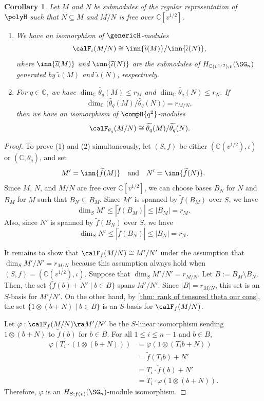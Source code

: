 \documentclass[12pt, reqno]{amsart}
\theoremstyle{plain}
\newtheorem{corollary}[corollary]{Corollary}
\theoremstyle{definition}
\numberwithin{equation}{section}
\numberwithin{figure}{section}
\numberwithin{table}{section}
\def\C{\mathbb C}
\begin{document}
\begin{corollary}\label{cor: algebra homomorphism vs functor sub of regular}
Let $M$ and $N$ be submodules of the regular representation of $\polyH$ such that $N \subseteq M$ and $M/N$ is free over $\C[v^{1/2}]$.
\begin{enumerate}[label={\rm (\arabic*)}]
\item 
We have an isomorphism of $\genericH$-modules
\[
\calF_{\iota}(M/N) \cong 
\inn{\widetilde{\iota}(M)}/ 
\inn{\widetilde{\iota}(N)},
\]
where 
$\inn{\widetilde{\iota}(M)}$ and
$\inn{\widetilde{\iota}(N)}$ are the submodules of
$H_{\C(v^{1/2}); v}(\SG_n)$ generated by
$\widetilde{\iota}(M)$ and $\widetilde{\iota}(N)$, respectively.

\item 
For $q \in \C$, we have $\dim_{\C} \widetilde{\theta_q}(M) \leq r_M$ and $\dim_{\C} \widetilde{\theta_q}(N) \leq r_N$.
If
\[
\dim_{\C}\bigl(\widetilde{\theta_q}(M)/\widetilde{\theta_q}(N)\bigr)
= r_{M/N},
\]
then we have an isomorphism of $\compH{q^2}$-modules
\[
\calF_{\theta_q}(M/N)
\cong
\widetilde{\theta_q}(M)/\widetilde{\theta_q}(N).
\]
\end{enumerate}
\end{corollary}
\begin{proof}
To prove (1) and (2) simultaneously, let $(S, f)$ be either $(\C(v^{1/2}), \iota)$ or $(\C, \theta_q)$, and set 
\[
M' = \inn{\widetilde{f}(M)} \quad\text{and}\quad N' = \inn{\widetilde{f}(N)}.
\] 
Since $M$, $N$, and $M/N$ are free over $\C[v^{1/2}]$, we can choose bases $B_N$ for $N$ and $B_{M}$ for $M$ such that $B_N \subseteq B_M$.
Since  $M'$ is spanned by $\widetilde{f}(B_M)$ over $S$, we have 
\[
\dim_S M' \leq |\widetilde{f}(B_M)| \leq |B_M| =  r_M.
\]
Also, since $N'$ is spanned by $\widetilde{f}(B_N)$ over $S$, we have
\[
\dim_S N' \leq |\widetilde{f}(B_N)| \leq |B_N| =  r_N.
\]

It remains to show that $\calF_f(M/N) \cong M'/N'$ under the assumption that $\dim_S M'/N' = r_{M/N}$ because this assumption always hold when $(S,f) = (\C(v^{1/2}), \iota)$.
Suppose that $\dim_S M' / N' = r_{M/N}$.
Let $B := B_M \setminus B_N$.
Then, the set $\{\widetilde{f}(b) + N' \mid b \in B \}$ spans  $M'/N'$. 
Since $|B| = r_{M/N}$, this set is an $S$-basis for $M'/N'$. 
On the other hand, by \cref{thm: rank of tensored theta our cons}, the set $\{1 \otimes (b + N) \mid b \in B \}$ is an $S$-basis for $\calF_{f}(M/N)$.

Let $\varphi: \calF_{f}(M/N) \ra M'/N'$
be the $S$-linear isomorphism sending $1 \otimes (b + N)$ to $\widetilde{f}(b)$ for $b \in B$.
For all $1 \le i \le n-1$ and $b \in B$,
\begin{align*}
\varphi(T_i \cdot (1\otimes (b + N))) 
&= \varphi(1\otimes (T_i  b + N))\\
&= \widetilde{f}(T_i b) + N'\\
&= T_i \cdot \widetilde{f}(b) + N'\\
&= T_i \cdot \varphi(1 \otimes (b+N)).
\end{align*}
Therefore, $\varphi$ is an $H_{S;f(v)}(\SG_n)$-module isomorphism.
\end{proof}
\end{document}
